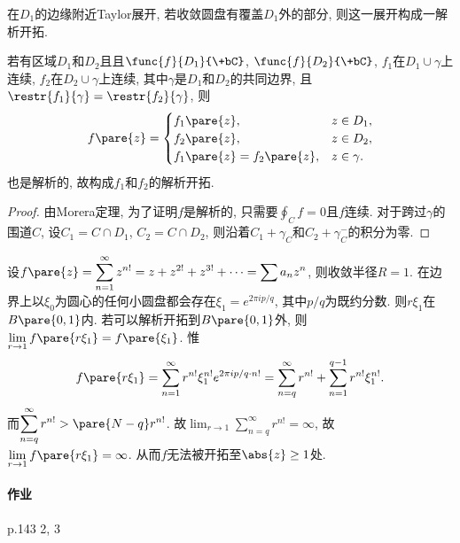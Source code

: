 \documentclass{ctexart}
\begin{document}
\begin{remark}
    在$D_1$的边缘附近Taylor展开, 若收敛圆盘有覆盖$D_1$外的部分, 则这一展开构成一解析开拓.
\end{remark}
若有区域$D_1$和$D_2$且且$\func{f}{D_1}{\+bC}$, $\func{f}{D_2}{\+bC}$, $f_1$在$D_1\cup\gamma$上连续, $f_2$在$D_2\cup\gamma$上连续, 其中$\gamma$是$D_1$和$D_2$的共同边界, 且$\restr{f_1}{\gamma} = \restr{f_2}{\gamma}$, 则
\[ f\pare{z} = \begin{cases}
    f_1\pare{z},& z\in D_1, \\
    f_2\pare{z},& z\in D_2, \\
    f_1\pare{z} = f_2\pare{z}, & z\in \gamma.
\end{cases} \]
也是解析的, 故构成$f_1$和$f_2$的解析开拓.
\begin{figure}[ht]
    \centering
\end{figure}
\begin{proof}
    由Morera定理, 为了证明$f$是解析的, 只需要$\displaystyle \oint_C f = 0$且$f$连续. 对于跨过$\gamma$的围道$C$, 设$C_1 = C\cap D_1$, $C_2 = C\cap D_2$, 则沿着$C_1 + \gamma_C$和$C_2 + \gamma^-_C$的积分为零.
\end{proof}
\begin{sample}
    \begin{ex}
        设$f\pare{z} = \displaystyle \sum_{n=1}^\infty z^{n!} = z + z^{2!} + z^{3!} + \cdots = \sum a_n z^n$, 则收敛半径$R=1$. 在边界上以$\xi_0$为圆心的任何小圆盘都会存在$\xi_1 = e^{2\pi i p/q}$, 其中$p/q$为既约分数. 则$r\xi_1$在$B\pare{0,1}$内. 若可以解析开拓到$B\pare{0,1}$外, 则$\displaystyle \lim_{r\rightarrow 1} f\pare{r\xi_1} = f\pare{\xi_1}$. 惟
        \[ f\pare{r\xi_1} = \sum_{n=1}^\infty r^{n!}\xi_1^{n!} e^{2\pi ip/q\cdot n!} = \sum_{n=q}^\infty r^{n!} + \sum_{n=1}^{q-1} r^{n!}\xi_1^{n!}. \]
        而$\displaystyle \sum_{n=q}^\infty r^{n!} > \pare{N-q}r^{n!}$. 故$\displaystyle \lim_{r\rightarrow 1} \sum_{n=q}^\infty r^{n!} = \infty$, 故$\displaystyle \lim_{r\rightarrow 1} f\pare{r\xi_1} = \infty$. 从而$f$无法被开拓至$\abs{z}\ge 1$处.
    \end{ex}
\end{sample}

\paragraph{作业} %
\label{par:作业}

p.143 2, 3

\end{document}
